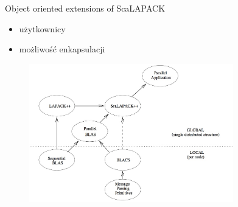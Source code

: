 	\begin{frame}{Object oriented extensions of ScaLAPACK}
		\begin{itemize}
			\item użytkownicy
			\item możliwość enkapsulacji
		\end{itemize}
		\begin{figure}
			\includegraphics[height=6cm]{img/13/scalapackextensions}
		\end{figure}
	\end{frame}